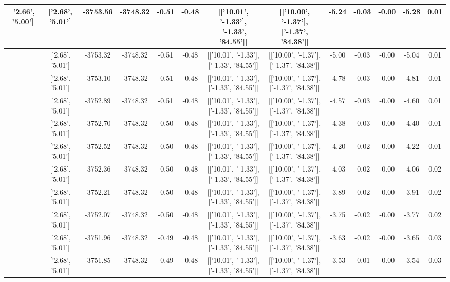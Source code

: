 \begin{table}[htbp]
\begin{adjustbox}{angle=90}
\begin{tabular}{|c|c|c|c|c|c|c|c|c|c|c|c|c|}
 ['2.66', '5.00'] & ['2.68', '5.01'] & -3753.56 & -3748.32 & -0.51 & -0.48 & [['10.01', '-1.33'], ['-1.33', '84.55']] & [['10.00', '-1.37'], ['-1.37', '84.38']] & -5.24 & -0.03 & -0.00 & -5.28 & 0.01\\ \hline
 ['2.66', '5.00'] & ['2.68', '5.01'] & -3753.32 & -3748.32 & -0.51 & -0.48 & [['10.01', '-1.33'], ['-1.33', '84.55']] & [['10.00', '-1.37'], ['-1.37', '84.38']] & -5.00 & -0.03 & -0.00 & -5.04 & 0.01\\ \hline
 ['2.67', '5.00'] & ['2.68', '5.01'] & -3753.10 & -3748.32 & -0.51 & -0.48 & [['10.01', '-1.33'], ['-1.33', '84.55']] & [['10.00', '-1.37'], ['-1.37', '84.38']] & -4.78 & -0.03 & -0.00 & -4.81 & 0.01\\ \hline
 ['2.67', '5.00'] & ['2.68', '5.01'] & -3752.89 & -3748.32 & -0.51 & -0.48 & [['10.01', '-1.33'], ['-1.33', '84.55']] & [['10.00', '-1.37'], ['-1.37', '84.38']] & -4.57 & -0.03 & -0.00 & -4.60 & 0.01\\ \hline
 ['2.67', '5.00'] & ['2.68', '5.01'] & -3752.70 & -3748.32 & -0.50 & -0.48 & [['10.01', '-1.33'], ['-1.33', '84.55']] & [['10.00', '-1.37'], ['-1.37', '84.38']] & -4.38 & -0.03 & -0.00 & -4.40 & 0.01\\ \hline
 ['2.67', '5.00'] & ['2.68', '5.01'] & -3752.52 & -3748.32 & -0.50 & -0.48 & [['10.01', '-1.33'], ['-1.33', '84.55']] & [['10.00', '-1.37'], ['-1.37', '84.38']] & -4.20 & -0.02 & -0.00 & -4.22 & 0.01\\ \hline
 ['2.67', '5.00'] & ['2.68', '5.01'] & -3752.36 & -3748.32 & -0.50 & -0.48 & [['10.01', '-1.33'], ['-1.33', '84.55']] & [['10.00', '-1.37'], ['-1.37', '84.38']] & -4.03 & -0.02 & -0.00 & -4.06 & 0.02\\ \hline
 ['2.67', '5.00'] & ['2.68', '5.01'] & -3752.21 & -3748.32 & -0.50 & -0.48 & [['10.01', '-1.33'], ['-1.33', '84.55']] & [['10.00', '-1.37'], ['-1.37', '84.38']] & -3.89 & -0.02 & -0.00 & -3.91 & 0.02\\ \hline
 ['2.67', '5.00'] & ['2.68', '5.01'] & -3752.07 & -3748.32 & -0.50 & -0.48 & [['10.01', '-1.33'], ['-1.33', '84.55']] & [['10.00', '-1.37'], ['-1.37', '84.38']] & -3.75 & -0.02 & -0.00 & -3.77 & 0.02\\ \hline
 ['2.67', '5.00'] & ['2.68', '5.01'] & -3751.96 & -3748.32 & -0.49 & -0.48 & [['10.01', '-1.33'], ['-1.33', '84.55']] & [['10.00', '-1.37'], ['-1.37', '84.38']] & -3.63 & -0.02 & -0.00 & -3.65 & 0.03\\ \hline
 ['2.68', '5.00'] & ['2.68', '5.01'] & -3751.85 & -3748.32 & -0.49 & -0.48 & [['10.01', '-1.33'], ['-1.33', '84.55']] & [['10.00', '-1.37'], ['-1.37', '84.38']] & -3.53 & -0.01 & -0.00 & -3.54 & 0.03\\ \hline

\end{tabular}
\end{adjustbox}
\end{table}
